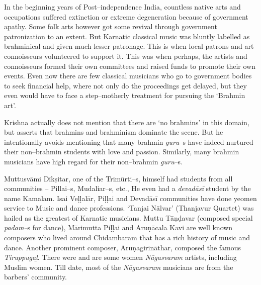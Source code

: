 In the beginning years of Post–independence India, countless native arts and occupations suffered extinction or extreme degeneration because of government apathy. Some folk arts however got some revival through government patronization to an extent. But Karnatic classical music was bluntly labelled as brahminical and given much lesser patronage. This is when local patrons and art connoisseurs volunteered to support it. This was when perhaps, the artists and connoisseurs formed their own committees and raised funds to promote their own events. Even now there are few classical musicians who go to government bodies to seek financial help, where not only do the proceedings get delayed, but they even would have to face a step–motherly treatment for pursuing the ‘Brahmin art’.

Krishna actually does not mention that there are ‘no brahmins’ in this domain, but asserts that brahmins and brahminism dominate the scene. But he intentionally avoids mentioning that many brahmin \textit{guru}–s have indeed nurtured their non–brahmin students with love and passion. Similarly, many brahmin musicians have high regard for their non–brahmin \textit{guru}–s.

Muttusvāmi Dīkṣitar, one of the Trimūrti–s, himself had students from all communities – Pillai–s, Mudaliar–s, etc., He even had a \textit{devadāsī} student by the name Kamalam. Isai Veḷḷalār, Piḷḷai and Devadāsī communities have done yeomen service to Music and dance professions. ‘Tanjai Nālvar’ (Thanjavur Quartet) was hailed as the greatest of Karnatic musicians. Muttu Tāṇḍavar (composed special \textit{padam–}s for dance), Mārimutta Piḷḷai and Aruṇācala Kavi are well known composers who lived around Chidambaram that has a rich history of music and dance. Another prominent composer, Aruṇagirināthar, composed the famous \textit{Tiruppugaḻ}. There were and are some women \textit{Nāgasvaram} artists, including Muslim women. Till date, most of the \textit{Nāgasvaram} musicians are from the barbers’ community.

